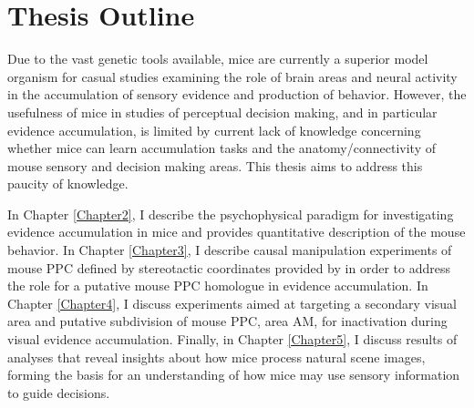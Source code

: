 \section{Thesis Outline}
Due to the vast genetic tools available, mice are currently a superior model organism for casual studies examining the role of brain areas and neural activity in the accumulation of sensory evidence and production of behavior. However, the usefulness of mice in studies of perceptual decision making, and in particular evidence accumulation, is limited by current lack of knowledge concerning whether mice can learn accumulation tasks and the anatomy/connectivity of mouse sensory and decision making areas. This thesis aims to address this paucity of knowledge. \par 

In Chapter \ref{Chapter2}, I describe the psychophysical paradigm for investigating evidence accumulation in mice and provides quantitative description of the mouse behavior. In Chapter \ref{Chapter3}, I describe causal manipulation experiments of mouse PPC defined by stereotactic coordinates provided by \textcite{Harvey2012} in order to address the role for a putative mouse PPC homologue in evidence accumulation. In Chapter \ref{Chapter4}, I discuss experiments aimed at targeting a secondary visual area and putative subdivision of mouse PPC, area AM, for inactivation during visual evidence accumulation. Finally, in Chapter \ref{Chapter5}, I discuss results of analyses that reveal insights about how mice process natural scene images, forming the basis for an understanding of how mice may use sensory information to guide decisions.

